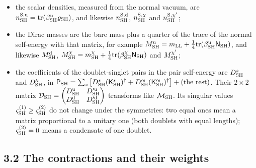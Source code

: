 \documentclass[
  10pt,
]{article}
\providecommand{\tightlist}{%
  \setlength{\itemsep}{0pt}\setlength{\parskip}{0pt}}
\begin{document}
\begin{itemize}
\tightlist
\item
  the scalar densities, measured from the normal vacuum, are
  \(n^{\rm S,u}_{\rm SH}=\mathrm{tr}(\beta^{\rm u}_{\rm SH}\varrho_{\rm SH})\),
  and likewise \(n^{\rm S,d}_{\rm SH}\), \(n^{{\rm S},\chi}_{\rm SH}\)
  and \(n^{{\rm S},\chi'}_{\rm SH}\);
\item
  the Dirac masses are the bare mass plus a quarter of the trace of the
  normal self-energy with that matrix, for example
  \(M^{\rm u}_{\rm SH}=m_{\rm LL}+\tfrac14\mathrm{tr}(\beta^{\rm u}_{\rm SH}\mathsf N_{\rm SH})\),
  and likewise \(M^{\rm d}_{\rm SH}\),
  \(M^\chi_{\rm SH}=m^\chi_{\rm SH}+\tfrac14\mathrm{tr}(\beta^\chi_{\rm SH}\mathsf N_{\rm SH})\)
  and \(M^{\chi'}_{\rm SH}\);
\item
  the coefficients of the doublet-singlet pairs in the pair self-energy
  are \(D^s_{\rm SH}\) and \(D'^s_{\rm SH}\), in
  \(\mathsf P_{\rm SH}=\sum_s\big[D^s_{\rm SH}(\mathsf K^s_{\rm SH})^\dagger+D'^s_{\rm SH}(\mathsf K'^s_{\rm SH})^\dagger\big]+(\text{the rest})\).
  Their \(2\times2\) matrix
  \(\mathcal D_{\rm SH}=\begin{pmatrix}D^{\rm u}_{\rm SH}&D'^{\rm u}_{\rm SH}\\D^{\rm d}_{\rm SH}&D'^{\rm d}_{\rm SH}\end{pmatrix}\)
  transforms like \(\mathcal M_{\rm SH}\). Its singular values
  \(\varsigma^{(1)}_{\rm SH}\ge\varsigma^{(2)}_{\rm SH}\) do not change
  under the symmetries: two equal ones mean a matrix proportional to a
  unitary one (both doublets with equal lengths);
  \(\varsigma^{(2)}_{\rm SH}=0\) means a condensate of one doublet.
\end{itemize}

\hypertarget{the-contractions-and-their-weights}{%
\subsection{3.2 The contractions and their
weights}\label{the-contractions-and-their-weights}}
\end{document}
